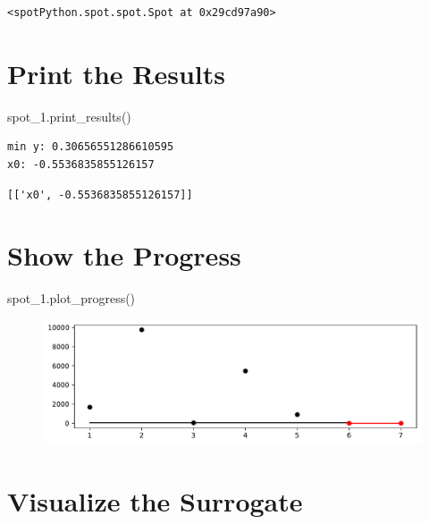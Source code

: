 \documentclass[
  letterpaper,
  DIV=11,
  numbers=noendperiod]{scrreprt}
\newenvironment{Shaded}{\begin{snugshade}}{\end{snugshade}}
\newcommand{\NormalTok}[1]{\textcolor[rgb]{0.00,0.23,0.31}{#1}}
\begin{document}
\begin{verbatim}
<spotPython.spot.spot.Spot at 0x29cd97a90>
\end{verbatim}

\hypertarget{print-the-results-5}{%
\section{Print the Results}\label{print-the-results-5}}

\begin{Shaded}
\begin{Highlighting}[]
\NormalTok{spot\_1.print\_results()}
\end{Highlighting}
\end{Shaded}

\begin{verbatim}
min y: 0.30656551286610595
x0: -0.5536835855126157
\end{verbatim}

\begin{verbatim}
[['x0', -0.5536835855126157]]
\end{verbatim}

\hypertarget{show-the-progress-2}{%
\section{Show the Progress}\label{show-the-progress-2}}

\begin{Shaded}
\begin{Highlighting}[]
\NormalTok{spot\_1.plot\_progress()}
\end{Highlighting}
\end{Shaded}

\begin{figure}[H]

{\centering \includegraphics{99_spot_doc_files/figure-pdf/cell-8-output-1.pdf}

}

\end{figure}

\hypertarget{visualize-the-surrogate}{%
\section{Visualize the Surrogate}\label{visualize-the-surrogate}}
\end{document}
